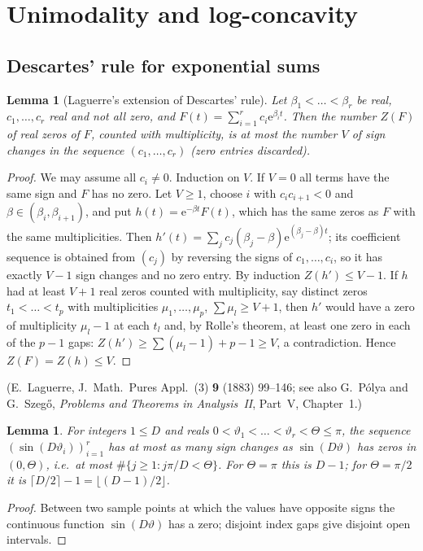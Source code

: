 \documentclass[11pt,a4paper]{article}
\newtheorem{lemma}[theorem]{Lemma}
\theoremstyle{definition}
\theoremstyle{remark}
\newcommand{\ee}{\mathrm{e}}
\begin{document}
\section{Unimodality and log-concavity}\label{sec:unimodal}

\subsection{Descartes' rule for exponential sums}

\begin{lemma}[Laguerre's extension of Descartes' rule]\label{lem:descartes}
Let $\beta_1<\dots<\beta_r$ be real, $c_1,\dots,c_r$ real and not all zero, and
$F(t)=\sum_{i=1}^rc_i\ee^{\beta_it}$. Then the number $Z(F)$ of real zeros of $F$, counted with multiplicity,
is at most the number $V$ of sign changes in the sequence $(c_1,\dots,c_r)$ (zero entries discarded).
\end{lemma}
\begin{proof}
We may assume all $c_i\ne0$. Induction on $V$. If $V=0$ all terms have the same sign and $F$ has no zero.
Let $V\ge1$, choose $i$ with $c_ic_{i+1}<0$ and $\beta\in(\beta_i,\beta_{i+1})$, and put
$h(t)=\ee^{-\beta t}F(t)$, which has the same zeros as $F$ with the same multiplicities. Then
$h'(t)=\sum_jc_j(\beta_j-\beta)\ee^{(\beta_j-\beta)t}$; its coefficient sequence is obtained from $(c_j)$ by
reversing the signs of $c_1,\dots,c_i$, so it has exactly $V-1$ sign changes and no zero entry. By induction
$Z(h')\le V-1$. If $h$ had at least $V+1$ real zeros counted with multiplicity, say distinct zeros
$t_1<\dots<t_p$ with multiplicities $\mu_1,\dots,\mu_p$, $\sum\mu_l\ge V+1$, then $h'$ would have a zero of
multiplicity $\mu_l-1$ at each $t_l$ and, by Rolle's theorem, at least one zero in each of the $p-1$ gaps:
$Z(h')\ge\sum(\mu_l-1)+p-1\ge V$, a contradiction. Hence $Z(F)=Z(h)\le V$.
\end{proof}
\noindent(E.~Laguerre, J.\ Math.\ Pures Appl.\ (3) \textbf{9} (1883) 99--146; see also G.~P\'olya and
G.~Szeg\H{o}, \emph{Problems and Theorems in Analysis~II}, Part~V, Chapter~1.)

\begin{lemma}\label{lem:signchanges}
For integers $1\le D$ and reals $0<\vartheta_1<\dots<\vartheta_r<\Theta\le\pi$, the sequence
$(\sin(D\vartheta_i))_{i=1}^r$ has at most as many sign changes as $\sin(D\vartheta)$ has zeros in $(0,\Theta)$,
i.e.\ at most $\#\{j\ge1: j\pi/D<\Theta\}$. For $\Theta=\pi$ this is $D-1$; for $\Theta=\pi/2$ it is
$\lceil D/2\rceil-1=\lfloor (D-1)/2\rfloor$.
\end{lemma}
\begin{proof}
Between two sample points at which the values have opposite signs the continuous function $\sin(D\vartheta)$
has a zero; disjoint index gaps give disjoint open intervals.
\end{proof}
\end{document}
